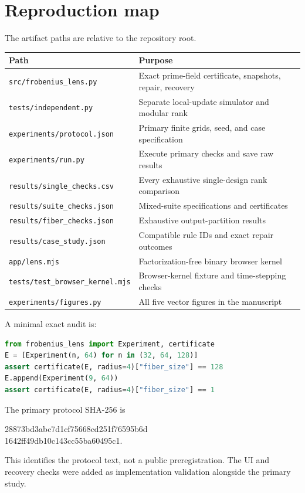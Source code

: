\documentclass{ijuc}
\begin{document}
\section{Reproduction map}
The artifact paths are relative to the repository root.
\begin{table}[h]
\centering\scriptsize
\begin{tabular}{@{}p{.44\linewidth}p{.48\linewidth}@{}}
\toprule
Path & Purpose\\\midrule
\texttt{src/frobenius\_lens.py} & Exact prime-field certificate, snapshots, repair, recovery\\
\texttt{tests/independent.py} & Separate local-update simulator and modular rank\\
\texttt{experiments/protocol.json} & Primary finite grids, seed, and case specification\\
\texttt{experiments/run.py} & Execute primary checks and save raw results\\
\texttt{results/single\_checks.csv} & Every exhaustive single-design rank comparison\\
\texttt{results/suite\_checks.json} & Mixed-suite specifications and certificates\\
\texttt{results/fiber\_checks.json} & Exhaustive output-partition results\\
\texttt{results/case\_study.json} & Compatible rule IDs and exact repair outcomes\\
\texttt{app/lens.mjs} & Factorization-free binary browser kernel\\
\texttt{tests/test\_browser\_kernel.mjs} & Browser-kernel fixture and time-stepping checks\\
\texttt{experiments/figures.py} & All five vector figures in the manuscript\\\bottomrule
\end{tabular}
\end{table}

A minimal exact audit is:
\begin{lstlisting}[language=Python]
from frobenius_lens import Experiment, certificate
E = [Experiment(n, 64) for n in (32, 64, 128)]
assert certificate(E, radius=4)["fiber_size"] == 128
E.append(Experiment(9, 64))
assert certificate(E, radius=4)["fiber_size"] == 1
\end{lstlisting}
The primary protocol SHA-256 is
\begin{center}\small\ttfamily
28873bd3abc7d1cf75668cd251f76595b6d\\
1642ff49db10c143cc55ba60495c1.
\end{center}
This identifies the protocol text, not a public preregistration. The UI and recovery checks were added as implementation validation alongside the primary study.
\end{document}
